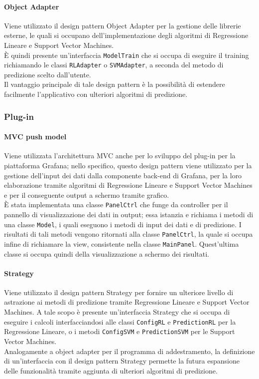 \documentclass[../specifica-tecnica.tex]{subfiles}
\begin{document}
\paragraph{Object Adapter}
Viene utilizzato il design pattern Object Adapter per la gestione delle librerie esterne, le quali si occupano dell'implementazione degli algoritmi di Regressione Lineare e 
Support Vector Machines. \\
È quindi presente un'interfaccia \texttt{ModelTrain} che si occupa di eseguire il training richiamando le classi \texttt{RLAdapter} o \texttt{SVMAdapter}, a seconda 
del metodo di predizione scelto dall'utente. \\
Il vantaggio principale di tale design pattern è la possibilità di estendere facilmente l'applicativo con ulteriori algoritmi di predizione.

\subsubsection{Plug-in}
\paragraph{MVC push model}
Viene utilizzata l'architettura MVC anche per lo sviluppo del plug-in per la piattaforma Grafana; nello specifico, questo design pattern viene utilizzato 
per la gestione dell'input dei dati dalla componente back-end di Grafana, per la loro elaborazione tramite algoritmi di Regressione Lineare e Support Vector Machines e 
per il conseguente output a schermo tramite grafico. \\
È stata implementata una classe \texttt{PanelCtrl} che funge da controller per il pannello di visualizzazione dei dati in output; essa istanzia e richiama i metodi di una classe \texttt{Model}, i quali eseguono 
i metodi di input dei dati e di predizione. I risultati di tali metodi vengono ritornati alla classe \texttt{PanelCtrl}, la quale si occupa infine di richiamare la view, consistente 
nella classe \texttt{MainPanel}. Quest'ultima classe si occupa quindi della visualizzazione a schermo dei risultati.

\paragraph{Strategy}
Viene utilizzato il design pattern Strategy per fornire un ulteriore livello di astrazione ai metodi di predizione tramite Regressione Lineare e Support Vector Machines. 
A tale scopo è presente un'interfaccia Strategy che si occupa di eseguire i calcoli interfacciandosi alle classi \texttt{ConfigRL} e \texttt{PredictionRL} per la Regressione Lineare, 
o i metodi \texttt{ConfigSVM} e \texttt{PredictionSVM} per le Support Vector Machines. \\
Analogamente a object adapter per il programma di addestramento, la definizione di un'interfaccia con il design pattern Strategy permette 
la futura espansione delle funzionalità tramite aggiunta di ulteriori algoritmi di predizione.
\end{document}

